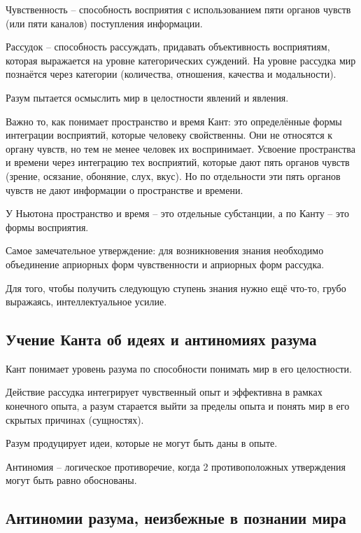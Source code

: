 \documentclass[main.tex]{subfiles}
\begin{document}
Чувственность -- способность восприятия с использованием пяти органов чувств (или пяти каналов) поступления информации.

Рассудок -- способность рассуждать, придавать объективность восприятиям, которая выражается на уровне категорических суждений.
На уровне рассудка мир познаётся через категории (количества, отношения, качества и модальности).

Разум пытается осмыслить мир в целостности явлений и явления.

Важно то, как понимает пространство и время Кант: это определённые формы интеграции восприятий, которые человеку свойственны.
Они не относятся к органу чувств, но тем не менее человек их воспринимает.
Усвоение пространства и времени через интеграцию тех восприятий, которые дают пять органов чувств (зрение, осязание, обоняние, слух, вкус).
Но по отдельности эти пять органов чувств не дают информации о пространстве и времени.

У Ньютона пространство и время -- это отдельные субстанции, а по Канту -- это формы восприятия.

Самое замечательное утверждение: для возникновения знания необходимо объединение априорных форм чувственности и априорных форм рассудка.

Для того, чтобы получить следующую ступень знания нужно ещё что-то, грубо выражаясь, интеллектуальное усилие.

\subsection{Учение Канта об идеях и антиномиях разума}


Кант понимает уровень разума по способности понимать мир в его целостности.

Действие рассудка интегрирует чувственный опыт и эффективна в рамках конечного опыта, а разум старается выйти за пределы опыта и понять мир в его скрытых причинах (сущностях).

Разум продуцирует идеи, которые не могут быть даны в опыте.

Антиномия -- логическое противоречие, когда 2 противоположных утверждения могут быть равно обоснованы.

\subsection{Антиномии разума, неизбежные в познании мира}
\end{document}
